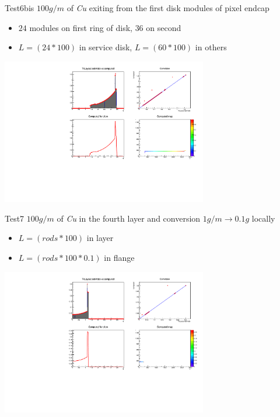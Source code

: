 \documentclass[pdftex, 11pt]{beamer}
\begin{document}
\begin{frame}
  \begin{block}{Test6bis}
    \alert{$100 g/m$} of \emph{Cu} exiting from the first disk modules of pixel endcap
    \begin{itemize}
    \item \alert{$24$} modules on first ring of disk, \alert{$36$} on second
    \item \alert{$L=(24*100)$} in service disk, \alert{$L=(60*100)$} in others
    \end{itemize}
  \end{block}
  \begin{center}
    \includegraphics[width=9cm]{img/test6bis.pdf}
  \end{center}
\end{frame}

\begin{frame}
  \begin{block}{Test7}
    \alert{$100 g/m$} of \emph{Cu} in the fourth layer and conversion \alert{$1g/m\to 0.1g$ locally}
    \begin{itemize}
    \item \alert{$L=(rods*100)$} in layer
    \item \alert{$L=(rods*100*0.1)$} in flange
    \end{itemize}
  \end{block}
  \begin{center}
    \includegraphics[width=9cm]{img/test7.pdf}
  \end{center}
\end{frame}
\end{document}

